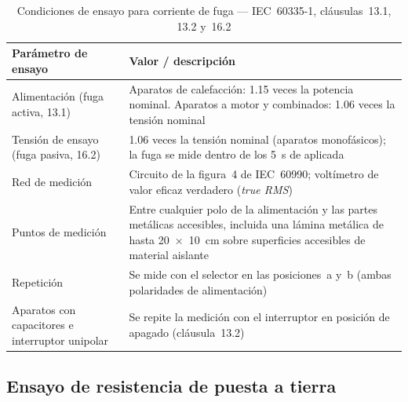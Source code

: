 \begin{table}[H]
\centering
\caption{Condiciones de ensayo para corriente de fuga --- IEC~60335-1, cláusulas~13.1, 13.2 y~16.2}
\label{tab:fuga_condiciones}
\renewcommand{\arraystretch}{1.35}
\begin{tabular}{@{} p{4.5cm} p{8cm} @{}}
\toprule
\textbf{Parámetro de ensayo} & \textbf{Valor / descripción} \\
\midrule
Alimentación (fuga activa, 13.1)
    & Aparatos de calefacción: \num{1.15} veces la potencia nominal. \newline
      Aparatos a motor y combinados: \num{1.06} veces la tensión nominal \\
\addlinespace
Tensión de ensayo (fuga pasiva, 16.2)
    & \num{1.06} veces la tensión nominal (aparatos monofásicos);
      la fuga se mide dentro de los \SI{5}{\second} de aplicada \\
\addlinespace
Red de medición
    & Circuito de la figura~4 de IEC~60990; voltímetro de valor
      eficaz verdadero (\textit{true RMS}) \\
\addlinespace
Puntos de medición
    & Entre cualquier polo de la alimentación y las partes metálicas
      accesibles, incluida una lámina metálica de hasta
      \SI{20 x 10}{\centi\meter} sobre superficies accesibles de
      material aislante \\
\addlinespace
Repetición
    & Se mide con el selector en las posiciones~a y~b
      (ambas polaridades de alimentación) \\
\addlinespace
Aparatos con capacitores e interruptor unipolar
    & Se repite la medición con el interruptor en posición de apagado
      (cláusula~13.2) \\
\bottomrule
\end{tabular}
\end{table}

\subsection{Ensayo de resistencia de puesta a tierra}
\label{subsec:tabla_tierra}

